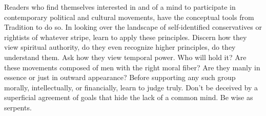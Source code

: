 Readers who find themselves interested in and of a mind to participate in contemporary political and cultural movements, have the conceptual tools from Tradition to do so. In looking over the landscape of self-identified conservatives or rightists of whatever stripe, learn to apply these principles. Discern how they view spiritual authority, do they even recognize higher principles, do they understand them. Ask how they view temporal power. Who will hold it? Are these movements composed of men with the right moral fiber? Are they manly in essence or just in outward appearance? Before supporting any such group morally, intellectually, or financially, learn to judge truly. Don't be deceived by a superficial agreement of goals that hide the lack of a common mind. Be wise as serpents.



